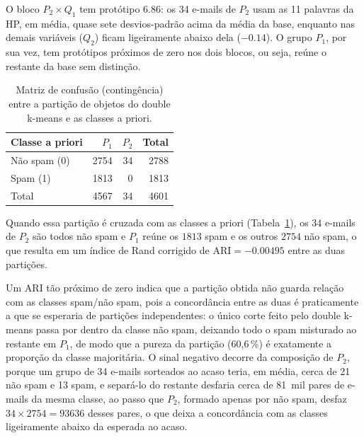\documentclass[11pt,a4paper]{article}
\newcommand{\ARI}{\mathrm{ARI}}
\begin{document}
O bloco $P_2\times Q_1$ tem protótipo $\num{6.86}$: os 34 e-mails de $P_2$ usam as 11 palavras da HP, em média, quase sete desvios-padrão acima da 
média da base, enquanto nas demais variáveis ($Q_2$) ficam ligeiramente abaixo dela ($\num{-0.14}$). O grupo $P_1$, por sua vez, tem protótipos
próximos de zero nos dois blocos, ou seja, reúne o restante da base sem distinção.

\begin{table}[H]
\centering
\caption{Matriz de confusão (contingência) entre a partição de objetos do double k-means e as classes a priori.}\label{tab:confusao}
\small
\begin{tabular}{@{}l r r r@{}}
\toprule
Classe a priori & $P_1$ & $P_2$ & Total \\
\midrule
Não spam (0) & \num{2754} & 34 & \num{2788} \\
Spam (1) & \num{1813} & 0 & \num{1813} \\
\midrule
Total & \num{4567} & 34 & \num{4601} \\
\bottomrule
\end{tabular}
\end{table}

Quando essa partição é cruzada com as classes a priori (Tabela~\ref{tab:confusao}), os 34 e-mails de $P_2$ são todos não spam e $P_1$ 
reúne os $\num{1813}$ spam e os outros $\num{2754}$ não spam, o que resulta em um índice de Rand corrigido de $\ARI=\num{-0.00495}$ 
entre as duas partições.

Um ARI tão próximo de zero indica que a partição obtida não guarda relação com as classes spam/não spam, pois a concordância entre as duas é praticamente
a que se esperaria de partições independentes: o único corte feito pelo double k-means passa por dentro da classe não spam, deixando todo o spam 
misturado ao restante em $P_1$, de modo que a pureza da partição (60,6\,\%) é exatamente a proporção da classe majoritária. O sinal negativo decorre da
composição de $P_2$, porque um grupo de 34 e-mails sorteados ao acaso teria, em média, cerca de 21 não spam e 13 spam, e separá-lo do restante 
desfaria cerca de 81~mil pares de e-mails da mesma classe, ao passo que $P_2$, formado apenas por não spam, desfaz $34\times\num{2754}=\num{93636}$ 
desses pares, o que deixa a concordância com as classes ligeiramente abaixo da esperada ao acaso. 
\end{document}
